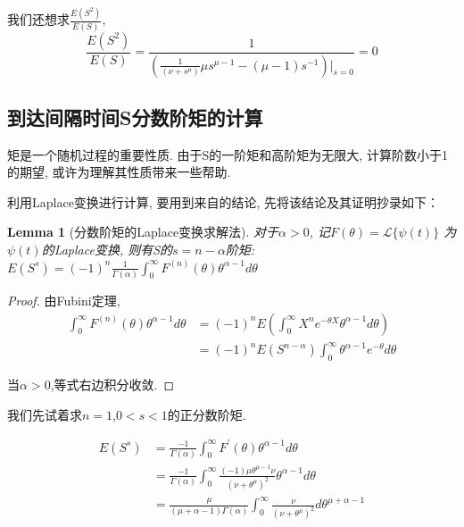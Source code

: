 \documentclass[a4paper, 12pt]{ctexart}
\newtheorem{lemma}[theorem]{Lemma}
\begin{document}
我们还想求$\frac{E(S^2)}{E(S)}$,   
\begin{equation}
\frac {E(S^2)}{E(S)} = \frac{1}{(\frac{1}{\left(\nu + s^\mu\right)} \mu s^{\mu-1} -(\mu -1)s^{-1})\big|_{s=0} }=0
\end{equation}

\subsection{到达间隔时间S分数阶矩的计算}
矩是一个随机过程的重要性质. 由于S的一阶矩和高阶矩为无限大,   计算阶数小于1的期望,   或许为理解其性质带来一些帮助. 

利用Laplace变换进行计算, 要用到来自\cite{15}的结论, 先将该结论及其证明抄录如下：
\begin{lemma}[分数阶矩的Laplace变换求解法]
对于$\alpha>0$,   记\begin{math}F(\theta)= \mathcal{L}\{\psi (t)\}\end{math} 为$\psi (t)$的Laplace变换,   则有S的$s=n-\alpha$阶矩:
$E(S^s)=(-1)^n\frac{1}{\Gamma (\alpha)} \int _0 ^{\infty} F^{(n)}(\theta)\theta ^{\alpha-1} d\theta$
\end{lemma}
\begin{proof}
由Fubini定理,
\begin{equation}
\begin{split}
\int _0^{\infty}F^{(n)}(\theta)\theta ^{\alpha -1}d\theta &= (-1)^n E\left(\int _0^{\infty}X^ne^{-\theta X}\theta ^{\alpha -1}d\theta\right)\\
&=(-1)^nE(S^{n-\alpha})\int _0^{\infty}\theta ^{\alpha -1}e^{-\theta}d\theta
\end{split}
\end{equation}

当$\alpha >0$,等式右边积分收敛.
\end{proof}

我们先试着求$n=1$,$0<s<1$的正分数阶矩.

\begin{equation}
\begin{split}
E(S^s)&=\frac{-1}{\Gamma (\alpha)}\int _0^{\infty} F^{\prime}(\theta)\theta^{\alpha-1}d\theta\\
&=\frac{-1}{\Gamma(\alpha)}\int _0^{\infty}\frac{(-1)\mu\theta^{\mu-1}\nu}{(\nu+\theta^\mu)^2}\theta^{\alpha-1}d\theta\\
&=\frac{\mu}{(\mu+\alpha-1)\Gamma(\alpha)}\int _0^{\infty}\frac{\nu}{(\nu+\theta^\mu)^2}d\theta^{\mu+\alpha-1}
\end{split}
\end{equation}
\end{document}
